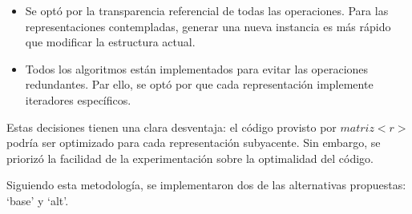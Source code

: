 \vspace{1em}
\begin{itemize}
    \item Se optó por la transparencia referencial de todas las operaciones. Para las representaciones contempladas, generar una nueva instancia es más rápido que modificar la estructura actual.
    \item Todos los algoritmos están implementados para evitar las operaciones redundantes. Par ello, se optó por que cada representación implemente iteradores específicos.
\end{itemize}

\vspace{1em}
Estas decisiones tienen una clara desventaja: el código provisto por $matriz<r>$ podría ser optimizado para cada representación subyacente. Sin embargo, se priorizó la facilidad de la experimentación sobre la optimalidad del código.

\vspace{1em}
Siguiendo esta metodología, se implementaron dos de las alternativas propuestas: `base' y `alt'.
